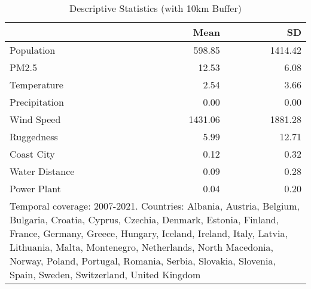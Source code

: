 \begin{table}

\caption{Descriptive Statistics (with 10km Buffer)}
\centering
\begin{tabular}[t]{lrr}
\toprule
  & Mean & SD\\
\midrule
Population & \num{598.85} & \num{1414.42}\\
PM2.5 & \num{12.53} & \num{6.08}\\
Temperature & \num{2.54} & \num{3.66}\\
Precipitation & \num{0.00} & \num{0.00}\\
Wind Speed & \num{1431.06} & \num{1881.28}\\
Ruggedness & \num{5.99} & \num{12.71}\\
Coast City & \num{0.12} & \num{0.32}\\
Water Distance & \num{0.09} & \num{0.28}\\
Power Plant & \num{0.04} & \num{0.20}\\
\bottomrule
\multicolumn{3}{l}{\rule{0pt}{1em}Temporal coverage: 2007-2021. Countries: Albania, Austria, Belgium, Bulgaria, Croatia, Cyprus, Czechia, Denmark, Estonia, Finland, France, Germany, Greece, Hungary, Iceland, Ireland, Italy, Latvia, Lithuania, Malta, Montenegro, Netherlands, North Macedonia, Norway, Poland, Portugal, Romania, Serbia, Slovakia, Slovenia, Spain, Sweden, Switzerland, United Kingdom}\\
\end{tabular}
\end{table}
